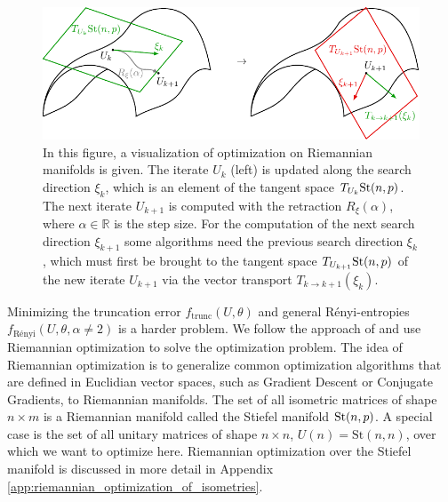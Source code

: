 \begin{figure}
	\centering
	\includegraphics[scale=1]{figures/tikz/YB_isoTPS/riemannian_optimization/riemannian_optimization.pdf}
	\caption{In this figure, a visualization of optimization on Riemannian manifolds is given. The iterate $U_k$ (left) is updated along the search direction $\xi_k$, which is an element of the tangent space $T_{U_k}\text{St}(n,p)$. The next iterate $U_{k+1}$ is computed with the retraction $R_\xi\left(\alpha\right)$, where $\alpha\in\mathbb{R}$ is the step size. For the computation of the next search direction $\xi_{k+1}$ some algorithms need the previous search direction $\xi_k$, which must first be brought to the tangent space $T_{U_{k+1}}\text{St}(n,p)$ of the new iterate $U_{k+1}$ via the vector transport $T_{k\rightarrow k+1}\left(\xi_k\right)$.}
	\label{fig:disentangling_riemannian_optimization}
\end{figure}
Minimizing the truncation error $f_\text{trunc}\left(U,\theta\right)$ and general Rényi-entropies $f_\text{Rényi}\left(U,\theta,\alpha\neq2\right)$ is a harder problem. We follow the approach of \cite{cite:isometric_tensor_network_states_in_two_dimensions, cite:efficient_simulation_of_dynamics_in_two_dimensional_quantum_spin_systems} and use Riemannian optimization \cite{cite:optimization_on_matrix_manifolds, cite:optimization_techniques_on_riemannian_manifolds, cite:riemannian_optimization_isometric_tensor_networks, cite:riemannian_geometry_automatic_differentiation_quantum_physics, cite:pymanopt} to solve the optimization problem. The idea of Riemannian optimization is to generalize common optimization algorithms that are defined in Euclidian vector spaces, such as Gradient Descent or Conjugate Gradients, to Riemannian manifolds. The set of all isometric matrices of shape $n\times m$ is a Riemannian manifold called the Stiefel manifold $\text{St}(n,p)$. A special case is the set of all unitary matrices of shape $n\times n$, $U(n)=\text{St}(n, n)$, over which we want to optimize here. Riemannian optimization over the Stiefel manifold is discussed in more detail in Appendix \ref{app:riemannian_optimization_of_isometries}. \par

